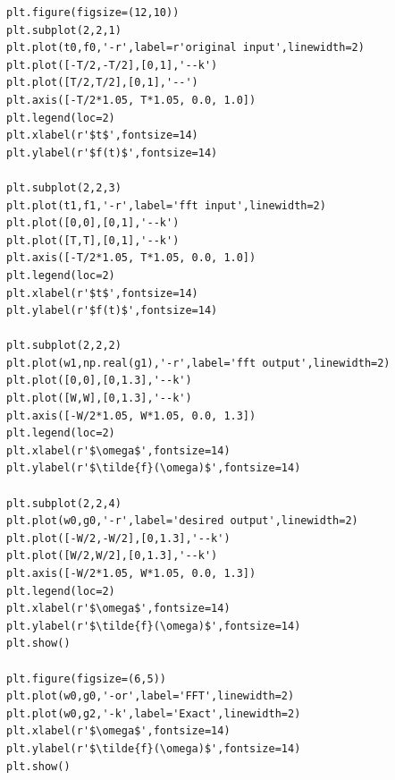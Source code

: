 \begin{verbatim}
plt.figure(figsize=(12,10))
plt.subplot(2,2,1)
plt.plot(t0,f0,'-r',label=r'original input',linewidth=2)
plt.plot([-T/2,-T/2],[0,1],'--k')
plt.plot([T/2,T/2],[0,1],'--')
plt.axis([-T/2*1.05, T*1.05, 0.0, 1.0])
plt.legend(loc=2)
plt.xlabel(r'$t$',fontsize=14)
plt.ylabel(r'$f(t)$',fontsize=14)

plt.subplot(2,2,3)
plt.plot(t1,f1,'-r',label='fft input',linewidth=2)
plt.plot([0,0],[0,1],'--k')
plt.plot([T,T],[0,1],'--k')
plt.axis([-T/2*1.05, T*1.05, 0.0, 1.0])
plt.legend(loc=2)
plt.xlabel(r'$t$',fontsize=14)
plt.ylabel(r'$f(t)$',fontsize=14)

plt.subplot(2,2,2)
plt.plot(w1,np.real(g1),'-r',label='fft output',linewidth=2)
plt.plot([0,0],[0,1.3],'--k')
plt.plot([W,W],[0,1.3],'--k')
plt.axis([-W/2*1.05, W*1.05, 0.0, 1.3])
plt.legend(loc=2)
plt.xlabel(r'$\omega$',fontsize=14)
plt.ylabel(r'$\tilde{f}(\omega)$',fontsize=14)

plt.subplot(2,2,4)
plt.plot(w0,g0,'-r',label='desired output',linewidth=2)
plt.plot([-W/2,-W/2],[0,1.3],'--k')
plt.plot([W/2,W/2],[0,1.3],'--k')
plt.axis([-W/2*1.05, W*1.05, 0.0, 1.3])
plt.legend(loc=2)
plt.xlabel(r'$\omega$',fontsize=14)
plt.ylabel(r'$\tilde{f}(\omega)$',fontsize=14)
plt.show()

plt.figure(figsize=(6,5))
plt.plot(w0,g0,'-or',label='FFT',linewidth=2)
plt.plot(w0,g2,'-k',label='Exact',linewidth=2)
plt.xlabel(r'$\omega$',fontsize=14)
plt.ylabel(r'$\tilde{f}(\omega)$',fontsize=14)
plt.show()
\end{verbatim}
\normalsize


